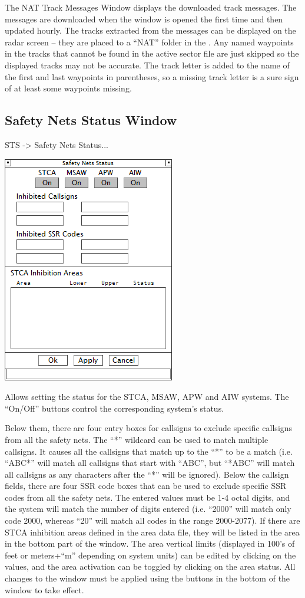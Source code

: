 \documentclass[11pt,a4paper]{memoir}
\begin{document}
The NAT Track Messages Window displays the downloaded track messages. The messages are downloaded when the window is opened the first time and then updated hourly. The tracks extracted from the messages can be displayed on the radar screen – they are placed to a “NAT” folder in the \textit{}. Any named waypoints in the tracks that cannot be found in the active sector file are just skipped so the displayed tracks may not be accurate. The track letter is added to the name of the first and last waypoints in parentheses, so a missing track letter is a sure sign of at least some waypoints missing.

\subsection{Safety Nets Status Window}
\label{win:snsw}

\textit{} STS -> Safety Nets Status...

\includegraphics{img/snets.png}

Allows setting the status for the STCA, MSAW, APW and AIW systems. The “On/Off” buttons control the corresponding system’s status.

Below them, there are four entry boxes for callsigns to exclude specific callsigns from all the safety nets. The “*” wildcard can be used to match multiple callsigns. It causes all the callsigns that match up to the “*” to be a match (i.e. “ABC*” will match all callsigns that start with “ABC”, but “*ABC” will match all callsigns as any characters after the “*” will be ignored).
Below the callsign fields, there are four SSR code boxes that can be used to exclude specific SSR codes from all the safety nets. The entered values must be 1-4 octal digits, and the system will match the number of digits entered (i.e. “2000” will match only code 2000, whereas “20” will match all codes in the range 2000-2077).
If there are STCA inhibition areas defined in the area data file, they will be listed in the area in the bottom part of the window. The area vertical limits (displayed in 100’s of feet or meters+“m” depending on system units) can be edited by clicking on the values, and the area activation can be toggled by clicking on the area status.
All changes to the window must be applied using the buttons in the bottom of the window to take effect.
\end{document}
